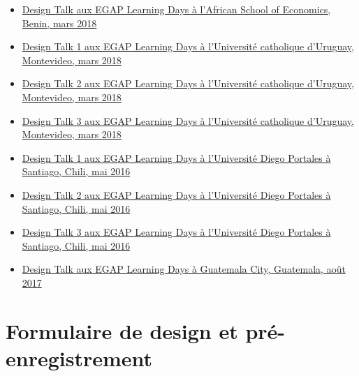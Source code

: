 \documentclass[
  12pt,
]{book}
\begin{document}
\begin{itemize}
\item
  \href{https://egap.github.io/learningdays-resources/Slides/Examples/research_design_2-benin.pdf}{Design Talk aux EGAP Learning Days à l'African School of Economics, Benin, mars 2018}
\item
  \href{https://egap.github.io/learningdays-resources/Slides/Examples/research_design_1-montevideo.pdf}{Design Talk 1 aux EGAP Learning Days à l'Université catholique d'Uruguay, Montevideo, mars 2018}
\item
  \href{https://egap.github.io/learningdays-resources/Slides/Examples/research_design_2-montevideo.pdf}{Design Talk 2 aux EGAP Learning Days à l'Université catholique d'Uruguay, Montevideo, mars 2018}
\item
  \href{https://egap.github.io/learningdays-resources/Slides/Examples/research_design_3-montevideo.pdf}{Design Talk 3 aux EGAP Learning Days à l'Université catholique d'Uruguay, Montevideo, mars 2018}
\item
  \href{https://egap.github.io/learningdays-resources/Slides/Examples/research_design_1-santiago.pdf}{Design Talk 1 aux EGAP Learning Days à l'Université Diego Portales à Santiago, Chili, mai 2016}
\item
  \href{https://egap.github.io/learningdays-resources/Slides/Examples/research_design_2-santiago.pdf}{Design Talk 2 aux EGAP Learning Days à l'Université Diego Portales à Santiago, Chili, mai 2016}
\item
  \href{https://egap.github.io/learningdays-resources/Slides/Examples/research_design_3-santiago.pdf}{Design Talk 3 aux EGAP Learning Days à l'Université Diego Portales à Santiago, Chili, mai 2016}
\item
  \href{https://egap.github.io/learningdays-resources/Slides/Examples/research_design-guatemala.pdf}{Design Talk aux EGAP Learning Days à Guatemala City, Guatemala, août 2017}
\end{itemize}

\hypertarget{formulaire-de-design-et-pruxe9-enregistrement}{%
\section{Formulaire de design et pré-enregistrement}\label{formulaire-de-design-et-pruxe9-enregistrement}}
\end{document}
